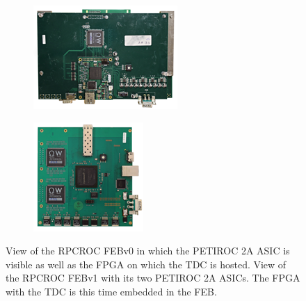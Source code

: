	\begin{figure}[H]
		\begin{subfigure}{0.5\linewidth}
		    \centering
			\includegraphics[width = 0.8\linewidth]{fig/chapt6/iRPC-RPCROCv0.png}
			\caption{\label{fig:RPCROC_FEB:A}}
		\end{subfigure}
		\begin{subfigure}{0.5\linewidth}
		    \centering
			\includegraphics[width = 0.7\linewidth]{fig/chapt6/iRPC-RPCROCv1.png}
			\caption{\label{fig:RPCROC_FEB:B}}
		\end{subfigure}
		\caption{\label{fig:RPCROC_FEB}  View of the RPCROC FEBv0 in which the PETIROC 2A ASIC is visible as well as the FPGA on which the TDC is hosted.  View of the RPCROC FEBv1 with its two PETIROC 2A ASICs. The FPGA with the TDC is this time embedded in the FEB.}
	\end{figure}

